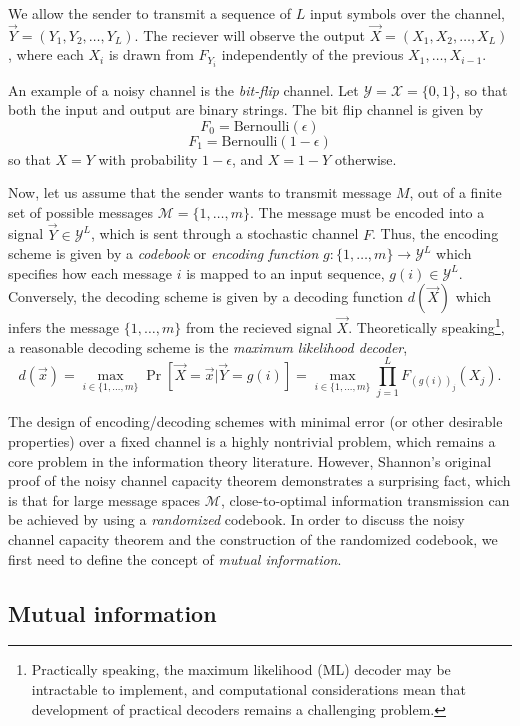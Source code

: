 We allow the sender to transmit a sequence of $L$ input symbols over
the channel, $\vec{Y} = (Y_1,Y_2,\hdots, Y_L)$. The reciever will observe the
output $\vec{X} = (X_1,X_2,\hdots, X_L)$, where each $X_i$ is drawn from
$F_{Y_i}$ independently of the previous $X_1,\hdots, X_{i-1}$.

An example of a noisy channel is the \emph{bit-flip} channel.
Let $\mathcal{Y} = \mathcal{X} = \{0,1\}$, so that both the input and output are binary strings.
The bit flip channel is given by
\[
F_0 = \text{Bernoulli}(\epsilon)
\]
\[
F_1 = \text{Bernoulli}(1-\epsilon)
\]
so that $X = Y$ with probability $1-\epsilon$, and $X = 1-Y$
otherwise.

Now, let us assume that the sender wants to transmit message $M$, out
of a finite set of possible messages $\mathcal{M} = \{1,\hdots, m\}$.
The message must be encoded into a signal $\vec{Y} \in \mathcal{Y}^L$,
which is sent through a stochastic channel $F$.  Thus, the encoding
scheme is given by a \emph{codebook} or \emph{encoding function} $g:
\{1,\hdots, m\} \to \mathcal{Y}^L$ which specifies how each message
$i$ is mapped to an input sequence, $g(i) \in \mathcal{Y}^L$.
Conversely, the decoding scheme is given by a decoding function
$d(\vec{X})$ which infers the message $\{1,\hdots, m\}$ from the
recieved signal $\vec{X}$.  Theoretically
speaking\footnote{Practically speaking, the maximum likelihood (ML)
  decoder may be intractable to implement, and computational
  considerations mean that development of practical decoders remains a
  challenging problem.}, a reasonable decoding scheme is the
\emph{maximum likelihood decoder},
\[
d(\vec{x}) = \max_{i \in \{1,\hdots, m\}} \Pr[\vec{X} = \vec{x}| \vec{Y} = g(i)] = \max_{i \in \{1,\hdots, m\}} \prod_{j=1}^L F_{(g(i))_j}(X_j).
\]

The design of encoding/decoding schemes with minimal error (or other
desirable properties) over a fixed channel is a highly nontrivial
problem, which remains a core problem in the information theory
literature.  However, Shannon's original proof of the noisy channel
capacity theorem demonstrates a surprising fact, which is that for
large message spaces $\mathcal{M}$, close-to-optimal information
transmission can be achieved by using a \emph{randomized} codebook.
In order to discuss the noisy channel capacity theorem and the
construction of the randomized codebook, we first need to define
the concept of \emph{mutual information}.

\subsection{Mutual information}

